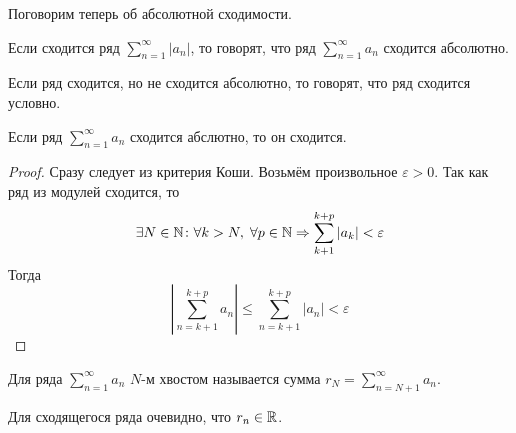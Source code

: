 \documentclass[a4paper, 12pt]{article}
\begin{document}
Поговорим теперь об абсолютной сходимости.
\begin{Def}
	Если сходится ряд $\sum\limits_{n = 1}^{\infty}|a_n|$, то говорят, что ряд $\sum\limits_{n = 1}^{\infty}a_n$ сходится абсолютно.
\end{Def}
\begin{Def}
	Если ряд сходится, но не сходится абсолютно, то говорят, что ряд сходится условно.
\end{Def}
\begin{Statement}
	Если ряд $\sum\limits_{n=1}^{\infty}a_n$ сходится абслютно, то он сходится.
\end{Statement}
\begin{proof}
	Сразу следует из критерия Коши. Возьмём произвольное $\varepsilon>0$. Так как ряд из модулей сходится, то $$\exists N\in \mathbb{N}\colon \forall k>N,\; \forall p\in \mathbb{N} \Rightarrow \sum\limits_{k+1}^{k+p}|a_k| < \varepsilon$$
	Тогда $$\left| \sum\limits_{n=k+1}^{k+p}a_n\right| \leqslant \sum\limits_{n=k+1}^{k+p}|a_n| < \varepsilon$$
\end{proof}

\begin{Def}
	Для ряда $\sum \limits_{n=1}^{\infty}a_n$ $N$-м хвостом называется сумма $r_N = \sum \limits_{n=N+1}^{\infty}a_n$.
\end{Def}
Для сходящегося ряда очевидно, что $r_n \in \mathbb{R}$.
\end{document}
